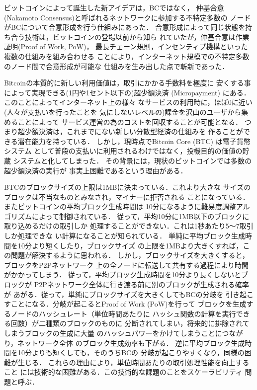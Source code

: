 \documentclass[graybox]{svmult}
\begin{document}
ビットコインによって誕生した新アイデアは，BCではなく，
仲基合意(Nakamoto Consensus)と呼ばれるネットワークに参加する不特定多数の
ノードがBCについて合意形成を行う仕組みにあった．
合意形成によって同じ状態を持ち合う技術は，ビットコインの登場以前から知ら
れていたが，仲基合意は作業証明(Proof of Work, PoW)\cite{DN1993,JJ1999}，
最長チェーン規則，インセンティブ機構といった複数の仕組みを組み合わせる
ことにより，インターネット規模での不特定多数のノード間で合意形成が可能な
仕組みを生み出した点で斬新であった．

Bitcoinの本質的に新しい利用価値は，取引にかかる手数料を極度に
安くする事によって実現できる(1円や1セント以下の)超少額決済 
(Micropayment) にある．このことによってインターネット上の様々
なサービスの利用時に，ほぼ0に近い(人々が支払いを行ったことを
気にしないレベルの)課金を沢山のユーザから集めることによって
サービス運営の為のコストを回収することが可能となる．
つまり超少額決済は，これまでにない新しい分散型経済の仕組みを
作ることができる潜在能力を持っている．
しかし，現時点でBitcoin Core (BTC) \cite{btc} は電子貨幣システム
として普段の支払いに利用されるわけではなく，投機目的の価値の貯蔵
システムと化してしまった．
その背景には，現状のビットコインでは多数の超少額決済の実行が
事実上困難であるという理由がある．

BTCのブロックサイズの上限は1MBに決まっている．これより大きな
サイズのブロックは不当なものとみなされ，マイナーに拒否される
ことになっている．またビットコインの平均ブロック生成時間は
10分になるように難易度調整アルゴリズムによって制御されている．
従って，平均10分に1MB以下のブロックに取り込めるだけの取引しか
処理することができない．これは1秒あたり5〜7取引しか処理できな
い計算になることが知られている．
単純に平均ブロック生成時間を10分より短くしたり，ブロックサイズ
の上限を1MBより大きくすれば，この問題が解決するように思われる．
しかし，ブロックサイズを大きくすると，ブロックをP2Pネットワーク
上の全ノードに転送して共有する過程により時間がかかってしまう．
従って，平均ブロック生成時間を10分より長くしないとブロックが
P2Pネットワーク全体に行き渡る前に別のブロックが生成される確率が
あがる．従って，単純にブロックサイズを大きくしてもBCの分岐を
引き起こすことになる．分岐が起こるとProof of Work (PoW)を行って
ブロックを生成するノードのハッシュレート（単位時間あたりに
ハッシュ関数の計算を実行できる回数）が二種類のブロックのものに
分断されてしまい，将来的に排除されてしまうブロックの生成に大量
のハッシュパワーをかけてしまうことにつながり，ネットワーク全体
のブロック生成効率も下がる．
逆に平均ブロック生成時間を10分よりも短くしても，そのうちBCの
分岐が起こりやすくなり，同様の困難が生じる．
これらの理由により，単位時間あたりの取引処理性能を向上すること
には技術的な困難がある．この技術的な課題のことをスケーラビリティ
問題と呼ぶ．
\end{document}
